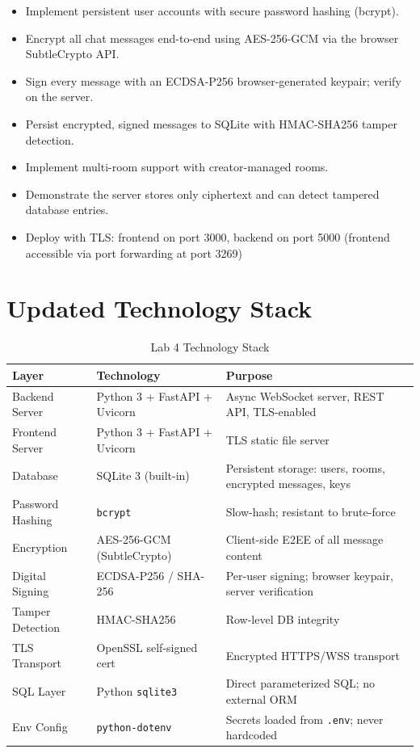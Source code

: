 \documentclass[12pt, a4paper]{article}
\begin{document}
\begin{itemize}[leftmargin=*]
    \item Implement persistent user accounts with secure password hashing (bcrypt).
    \item Encrypt all chat messages end-to-end using AES-256-GCM via the browser SubtleCrypto API.
    \item Sign every message with an ECDSA-P256 browser-generated keypair; verify on the server.
    \item Persist encrypted, signed messages to SQLite with HMAC-SHA256 tamper detection.
    \item Implement multi-room support with creator-managed rooms.
    \item Demonstrate the server stores only ciphertext and can detect tampered database entries.
    \item Deploy with TLS: frontend on port 3000, backend on port 5000 (frontend accessible via port forwarding at port 3269)
\end{itemize}

\section{Updated Technology Stack}

\begin{table}[H]
    \centering
    \caption{Lab 4 Technology Stack}
    \begin{tabularx}{\textwidth}{l l X}
        \toprule
        \textbf{Layer} & \textbf{Technology} & \textbf{Purpose} \\
        \midrule
        Backend Server   & Python 3 + FastAPI + Uvicorn & Async WebSocket server, REST API, TLS-enabled \\
        Frontend Server  & Python 3 + FastAPI + Uvicorn & TLS static file server \\
        Database         & SQLite 3 (built-in)          & Persistent storage: users, rooms, encrypted messages, keys \\
        Password Hashing & \texttt{bcrypt}              & Slow-hash; resistant to brute-force \\
        Encryption       & AES-256-GCM (SubtleCrypto)   & Client-side E2EE of all message content \\
        Digital Signing  & ECDSA-P256 / SHA-256         & Per-user signing; browser keypair, server verification \\
        Tamper Detection & HMAC-SHA256                  & Row-level DB integrity \\
        TLS Transport    & OpenSSL self-signed cert     & Encrypted HTTPS/WSS transport \\
        SQL Layer        & Python \texttt{sqlite3}      & Direct parameterized SQL; no external ORM \\
        Env Config       & \texttt{python-dotenv}       & Secrets loaded from \texttt{.env}; never hardcoded \\
        \bottomrule
    \end{tabularx}
\end{table}
\end{document}

